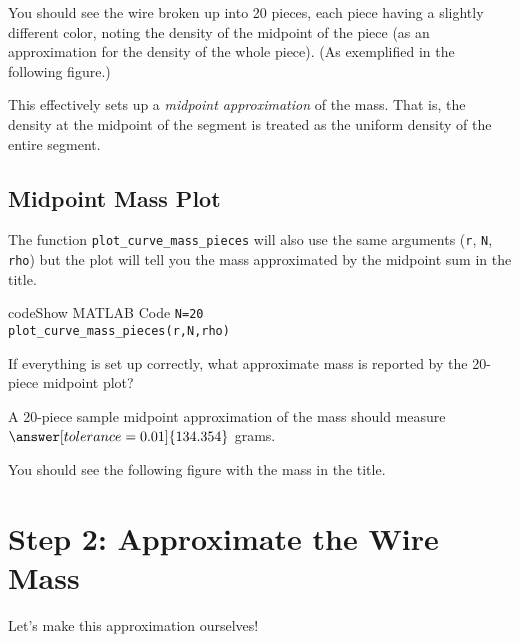 \documentclass{ximera}
\begin{document}
You should see the wire broken up into 20 pieces, each piece having a slightly different color, noting the density of the midpoint of the piece (as an approximation for the density of the whole piece). (As exemplified in the following figure.)


This effectively sets up a \emph{midpoint approximation} of the mass. That is, the density at the midpoint of the segment is treated as the uniform density of the entire segment.

\subsection*{Midpoint Mass Plot}

The function \texttt{plot\_curve\_mass\_pieces} will also use the same arguments (\texttt{r}, \texttt{N}, \texttt{rho}) but the plot will tell you the mass approximated by the midpoint sum in the title.

\begin{expandable}{code}{Show MATLAB Code}
\texttt{N=20}\\
\texttt{plot\_curve\_mass\_pieces(r,N,rho)}
\end{expandable}

\begin{problem}
If everything is set up correctly, what approximate mass is reported by the 20-piece midpoint plot? 

A 20-piece sample midpoint approximation of the mass should measure $\answer[tolerance=0.01]{134.354}$ grams.

    \begin{feedback}
    You should see the following figure with the mass in the title.
    \end{feedback}
\end{problem}

\section*{Step 2: Approximate the Wire Mass}

Let's make this approximation ourselves!
\end{document}
